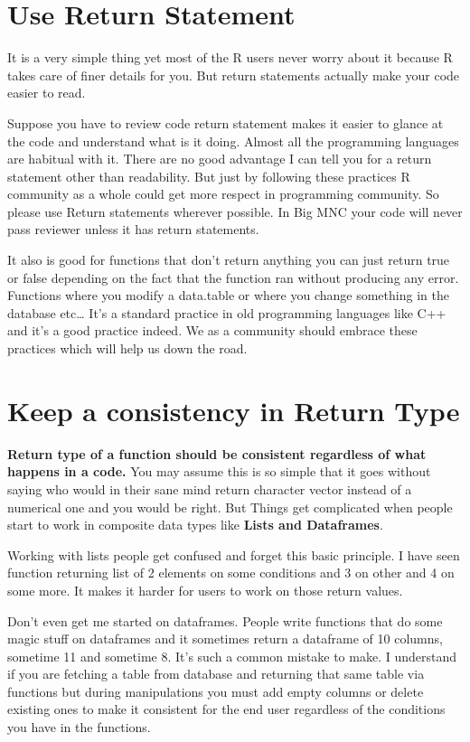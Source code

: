 \documentclass[
]{book}
\begin{document}
\hypertarget{use-return-statement}{%
\section{Use Return Statement}\label{use-return-statement}}

It is a very simple thing yet most of the R users never worry about it because R takes care of finer details for you. But return statements actually make your code easier to read.

Suppose you have to review code return statement makes it easier to glance at the code and understand what is it doing. Almost all the programming languages are habitual with it. There are no good advantage I can tell you for a return statement other than readability. But just by following these practices R community as a whole could get more respect in programming community. So please use Return statements wherever possible. In Big MNC your code will never pass reviewer unless it has return statements.

It also is good for functions that don't return anything you can just return true or false depending on the fact that the function ran without producing any error. Functions where you modify a data.table or where you change something in the database etc\ldots{} It's a standard practice in old programming languages like C++ and it's a good practice indeed. We as a community should embrace these practices which will help us down the road.

\hypertarget{keep-a-consistency-in-return-type}{%
\section{Keep a consistency in Return Type}\label{keep-a-consistency-in-return-type}}

\textbf{Return type of a function should be consistent regardless of what happens in a code.} You may assume this is so simple that it goes without saying who would in their sane mind return character vector instead of a numerical one and you would be right. But Things get complicated when people start to work in composite data types like \textbf{Lists and Dataframes}.

Working with lists people get confused and forget this basic principle. I have seen function returning list of 2 elements on some conditions and 3 on other and 4 on some more. It makes it harder for users to work on those return values.

Don't even get me started on dataframes. People write functions that do some magic stuff on dataframes and it sometimes return a dataframe of 10 columns, sometime 11 and sometime 8. It's such a common mistake to make. I understand if you are fetching a table from database and returning that same table via functions but during manipulations you must add empty columns or delete existing ones to make it consistent for the end user regardless of the conditions you have in the functions.
\end{document}

